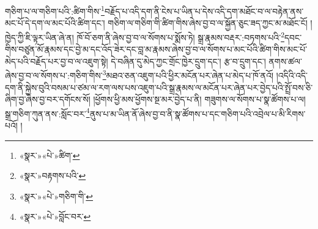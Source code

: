 གཅིག་པ་ལ་གཅིག་པའི་:ཚིག་གིས་\footnote{«སྣར་»«པེ་»ཚིག་}བརྗོད་པ་འདི་དག་ནི་ངེས་པ་ཡིན་པ་དེས་འདི་དག་མཐོང་བ་ལ་བརྟེན་ནས་མང་པོ་དེ་དག་ལ་མང་པོའི་ཚིག་དང་། གཅིག་ལ་གཅིག་གི་ཚིག་གིས་ཞེས་བྱ་བ་ལ་སྐྱོན་ཅུང་ཟད་ཀྱང་མ་མཐོང་ངོ། །ཁྱེད་ཀྱི་ཇི་ལྟར་ཡིན་ཞེ་ན། ཁོ་བོ་ཅག་ནི་ཞེས་བྱ་བ་ལ་སོགས་པ་སྨོས་ཏེ། སྒྲ་རྣམས་བརྡར་:བཏགས་པའི་\footnote{«སྣར་»བརྟགས་པའི་}དབང་གིས་བཙུན་མོ་རྣམས་དང་བྱེ་མ་དང་འོད་ཟེར་དང་བླ་མ་རྣམས་ཞེས་བྱ་བ་ལ་སོགས་པ་མང་པོའི་ཚིག་གིས་མང་པོ་མེད་པའི་བརྗོད་པར་བྱ་བ་ལ་འཇུག་སྟེ། དེ་བཞིན་དུ་མེད་ཀྱང་གྲོང་ཁྱེར་དྲུག་དང་། རྩ་བ་དྲུག་དང་། ནགས་ཚལ་ཞེས་བྱ་བ་ལ་སོགས་པ་:གཅིག་གིས་\footnote{«སྣར་»«པེ་»གཅིག་གི་}མཐའ་ཅན་འཇུག་པའི་ཕྱིར་མངོན་པར་ཞེན་པ་མེད་པ་ཁོ་ནའོ། །འདིའི་འདི་དག་ནི་སྐྱེས་བུའི་བསམ་པ་ཙམ་ལ་རག་ལས་པས་འཇུག་པའི་སྒྲ་རྣམས་ལ་མངོན་པར་ཞེན་པར་བྱེད་པའི་སྤྲོ་བས་ཅི་ཞིག་བྱ་ཞེས་བྱ་བར་དགོངས་སོ། །ཕྱོགས་ཕྱི་མས་ཕྱོགས་སྔ་མར་བྱེད་པ་ནི། གཟུགས་ལ་སོགས་པ་སྣ་ཚོགས་པ་ལ། སྒྲ་གཅིག་ཀུན་ནས་:སློང་བར་\footnote{«སྣར་»«པེ་»བློང་བར་}ནུས་པ་མ་ཡིན་ནོ་ཞེས་བྱ་བ་ནི་སྣ་ཚོགས་པ་དང་གཅིག་པའི་འབྲེལ་པ་མི་རིགས་པའོ། །
